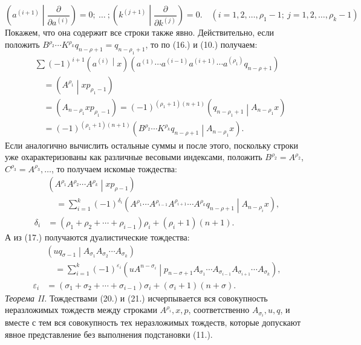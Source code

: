 \documentclass[11pt]{article}
\newcommand{\pair}[2]{\left(#1\middle|#2\right)}
\newcommand{\eps}{\varepsilon}
\begin{document}
\begin{equation}
 \left(a^{(i+1)}\middle|\frac{\partial}{\partial a^{(i)}}\right)=0;\ \ldots\ ;
 \left(k^{(j+1)}\middle|\frac{\partial}{\partial k^{(j)}}\right)=0.
 \quad (i=1,2,\ldots,\rho_1-1;\ j=1,2,\ldots,\rho_k-1)
\tag{19}
\end{equation}
Покажем, что она содержит все строки также явно. Действительно, если положить $B^{\rho_2}\cdots K^{\rho_k}q_{n-\rho+1}=q_{n-\rho_1+1}$, то по (16.) и (10.) получаем:
\[
\begin{aligned}
&\sum(-1)^{i+1}\pair{a^{(i)}}{x}
(a^{(1)}\cdots a^{(i-1)}a^{(i+1)}\cdots a^{(\rho_1)}q_{n-\rho+1})\\
&\quad=\pair{A^{\rho_1}}{xp_{\rho_1-1}}\\
&\quad=(A_{n-\rho_1}xp_{\rho_1-1})
=(-1)^{(\rho_1+1)(n+1)}\pair{q_{n-\rho_1+1}}{A_{n-\rho_1}x}\\
&\quad=(-1)^{(\rho_1+1)(n+1)}
\pair{B^{\rho_2}\cdots K^{\rho_k}q_{n-\rho+1}}{A_{n-\rho_1}x}.
\end{aligned}
\]
Если аналогично вычислить остальные суммы и после этого, поскольку строки уже охарактеризованы как различные весовыми индексами, положить $B^{\rho_2}=A^{\rho_2}$, $C^{\rho_3}=A^{\rho_3},\ldots$, то получаем искомые тождества:
\begin{equation}
\begin{aligned}
&\pair{A^{\rho_1}A^{\rho_2}\cdots A^{\rho_k}}{xp_{\rho-1}}\\
&\quad=\sum_{i=1}^{k}(-1)^{\delta_i}
\pair{A^{\rho_1}\cdots A^{\rho_{i-1}}A^{\rho_{i+1}}\cdots A^{\rho_k}q_{n-\rho+1}}{A_{n-\rho_i}x},\\
\delta_i&=(\rho_1+\rho_2+\cdots+\rho_{i-1})\rho_i+(\rho_i+1)(n+1).
\end{aligned}
\tag{20}
\end{equation}
А из (17.) получаются дуалистические тождества:
\begin{equation}
\begin{aligned}
&\pair{u q_{\sigma-1}}{A_{\sigma_1}A_{\sigma_2}\cdots A_{\sigma_k}}\\
&\quad=\sum_{i=1}^{k}(-1)^{\eps_i}
\pair{u A^{n-\sigma_i}}{p_{n-\sigma+1}A_{\sigma_1}\cdots A_{\sigma_{i-1}}A_{\sigma_{i+1}}\cdots A_{\sigma_k}},\\
\eps_i&=(\sigma_1+\sigma_2+\cdots+\sigma_{i-1})\sigma_i+(\sigma_i+1)(n+\sigma).
\end{aligned}
\tag{21}
\end{equation}
\emph{Теорема II.} Тождествами (20.) и (21.) исчерпывается вся совокупность неразложимых тождеств между строками $A^{\rho_i},x,p$, соответственно $A_{\sigma_i},u,q$, и вместе с тем вся совокупность тех неразложимых тождеств, которые допускают явное представление без выполнения подстановки (11.).
\end{document}
